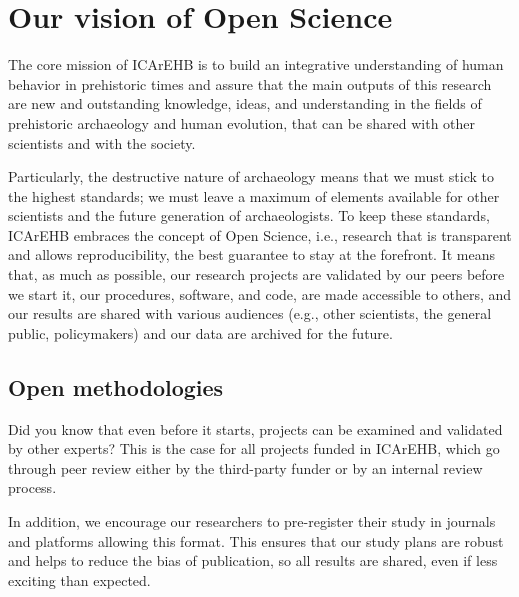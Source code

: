 \documentclass[
  letterpaper,
  DIV=11,
  numbers=noendperiod]{scrreprt}
\author{}
\date{}
\begin{document}
\ifdefined\Shaded\renewenvironment{Shaded}{\begin{tcolorbox}[breakable, boxrule=0pt, frame hidden, interior hidden, sharp corners, enhanced, borderline west={3pt}{0pt}{shadecolor}]}{\end{tcolorbox}}\fi

\hypertarget{our-vision-of-open-science}{%
\section*{Our vision of Open Science}\label{our-vision-of-open-science}}

The core mission of ICArEHB is to build an integrative understanding of
human behavior in prehistoric times and assure that the main outputs of
this research are new and outstanding knowledge, ideas, and
understanding in the fields of prehistoric archaeology and human
evolution, that can be shared with other scientists and with the
society.

Particularly, the destructive nature of archaeology means that we must
stick to the highest standards; we must leave a maximum of elements
available for other scientists and the future generation of
archaeologists. To keep these standards, ICArEHB embraces the concept of
Open Science, i.e., research that is transparent and allows
reproducibility, the best guarantee to stay at the forefront. It means
that, as much as possible, our research projects are validated by our
peers before we start it, our procedures, software, and code, are made
accessible to others, and our results are shared with various audiences
(e.g., other scientists, the general public, policymakers) and our data
are archived for the future.

\hypertarget{open-methodologies}{%
\subsection{Open methodologies}\label{open-methodologies}}

Did you know that even before it starts, projects can be examined and
validated by other experts? This is the case for all projects funded in
ICArEHB, which go through peer review either by the third-party funder
or by an internal review process.

In addition, we encourage our researchers to pre-register their study in
journals and platforms allowing this format. This ensures that our study
plans are robust and helps to reduce the bias of publication, so all
results are shared, even if less exciting than expected.
\end{document}

